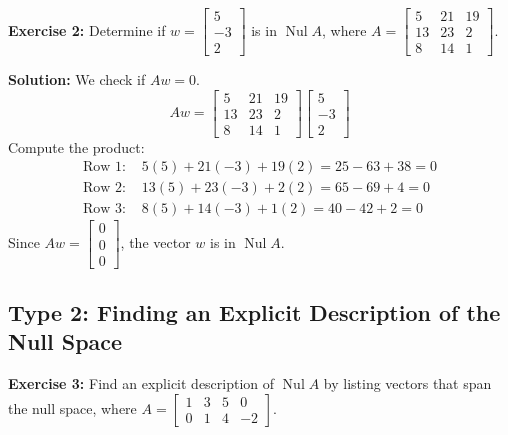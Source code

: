 \documentclass[11pt]{article}
\begin{document}
\vspace{0.5cm}

\textbf{Exercise 2:} Determine if $w = \begin{bmatrix} 5 \\ -3 \\ 2 \end{bmatrix}$ is in $\operatorname{Nul} A$, where $A = \begin{bmatrix} 5 & 21 & 19 \\ 13 & 23 & 2 \\ 8 & 14 & 1 \end{bmatrix}$.

\textbf{Solution:}
We check if $Aw = 0$.
\[
Aw = \begin{bmatrix} 5 & 21 & 19 \\ 13 & 23 & 2 \\ 8 & 14 & 1 \end{bmatrix} \begin{bmatrix} 5 \\ -3 \\ 2 \end{bmatrix}
\]
Compute the product:
\begin{align*}
\text{Row 1: } & 5(5) + 21(-3) + 19(2) = 25 - 63 + 38 = 0 \\
\text{Row 2: } & 13(5) + 23(-3) + 2(2) = 65 - 69 + 4 = 0 \\
\text{Row 3: } & 8(5) + 14(-3) + 1(2) = 40 - 42 + 2 = 0
\end{align*}
Since $Aw = \begin{bmatrix} 0 \\ 0 \\ 0 \end{bmatrix}$, the vector $w$ is in $\operatorname{Nul} A$.

\subsection{Type 2: Finding an Explicit Description of the Null Space}

\textbf{Exercise 3:} Find an explicit description of $\operatorname{Nul} A$ by listing vectors that span the null space, where $A = \begin{bmatrix} 1 & 3 & 5 & 0 \\ 0 & 1 & 4 & -2 \end{bmatrix}$.
\end{document}
